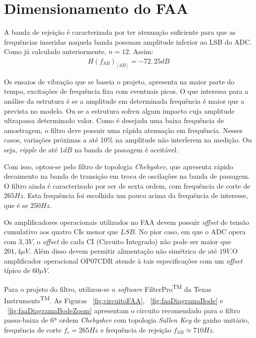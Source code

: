 \documentclass[
	12pt,				%
	openright,			%
	twoside,			%
	a4paper,			%
	english,			%
	french,				%
	spanish,			%
	brazil,				%
	]{abntex2}
\begin{document}
	\section{Dimensionamento do FAA}

		A banda de rejeição é caracterizada por ter atenuação
		suficiente para que as frequências inseridas naquela banda possuam amplitude
		inferior ao LSB do ADC. Como já calculado anteriormente, $n=12$. Assim:
		\begin{gather*}
			H(f_{SB})_{[dB]} = -72,25 dB
		\end{gather*}

		Os ensaios de vibração que se baseia o projeto, apresenta na maior parte do tempo, excitações de frequência fixa com eventuais picos. O que
		interessa para a análise da estrutura é se a amplitude em
		determinada frequência é maior que a prevista no modelo. Ou se a
		estrutura sofreu algum impacto cuja amplitude ultrapassa determinado
		valor. Como é desejada uma baixa frequência de amostragem, o filtro deve possuir uma rápida atenuação em frequência. Nesses casos, variações próximas a até $10\%$ na amplitude não interferem na medição. Ou seja, \textit{ripple} de até $1dB$ na banda de passagem é aceitável.

		Com isso, optou-se pelo filtro de topologia
		\textit{Chebyshev}, que apresenta rápido decaimento na banda de transição em troca de oscilações na banda de passagem. O filtro ainda é caracterizado por ser de sexta ordem, com
		frequência de corte de $265Hz$. Esta frequência foi escolhida um
		pouco acima da frequência de interesse, que é se $250Hz$.

		Os amplificadores operacionais utilizados no FAA devem
		possuir \textit{offset} de tensão cumulativo aos quatro CIs
		menor que $LSB$. No pior caso, em que o ADC opera com $3,3V$,
		o \textit{offset} de cada CI (Circuito Integrado) não pode ser
		maior que $201,4\mu V$. Além disso devem permitir alimentação
		não simétrica de até $19V$.O amplificador operacional OP07CDR atende à tais especificações com um \textit{offset} típico de $60\mu V$.

		Para o projeto do filtro, utilizou-se o \textit{software}
		FilterPro\textsuperscript{TM} da Texas
		Instruments\textsuperscript{TM}. As Figuras ~\ref{fig:circuitoFAA},
		~\ref{fig:faaDiagramaBode} e ~\ref{fig:faaDiagramaBodeZoom} apresentam o
		circuito recomendado para o filtro passa-baixa de 6ª ordem
		\textit{Chebyshev} com topologia \textit{Sallen Key} de ganho
		unitário, frequência de corte $f_c = 265Hz$ e frequência de
		rejeição $f_{SB}\simeq 710Hz$.
\end{document}
